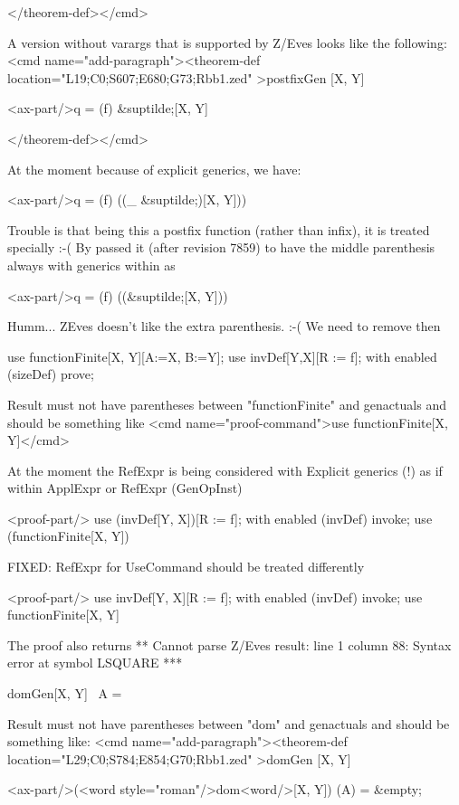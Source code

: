 </theorem-def></cmd>


 A version without varargs that is supported by Z/Eves looks like the following:
<cmd name="add-paragraph"><theorem-def location="L19;C0;S607;E680;G73;Rbb1.zed"   >postfixGen
[X, Y]

<ax-part/>q  =  (f) &suptilde;[X, Y]

</theorem-def></cmd>


 At the moment because of explicit generics, we have:

<ax-part/>q  =  (f) ((_ &suptilde;)[X, Y]))

Trouble is that being this a postfix function (rather than infix), it is treated specially :-(
By passed it (after revision 7859) to have the middle parenthesis always with generics within as

<ax-part/>q  =  (f) ((&suptilde;[X, Y]))

Humm... ZEves doesn't like the extra parenthesis. :-( We need to remove then

\begin{zproof}[postfixGen]
use functionFinite[X, Y][A:=X, B:=Y];
use invDef[Y,X][R := f];
with enabled (sizeDef) prove;
\end{zproof}

Result must not have parentheses between "functionFinite" and genactuals and should be something like
<cmd name="proof-command">use functionFinite[X, Y]</cmd>

At the moment the RefExpr is being considered with Explicit generics (!) as if within ApplExpr or RefExpr (GenOpInst)

<proof-part/>
use (invDef[Y, X])[R := f];
with enabled (invDef) invoke;
use (functionFinite[X, Y])

FIXED: RefExpr for UseCommand should be treated differently

<proof-part/> use invDef[Y, X][R := f];
with enabled (invDef) invoke;
use functionFinite[X, Y]

The proof also returns
**
Cannot parse Z/Eves result:
line 1 column 88: Syntax error at symbol LSQUARE
***


\begin{theorem}{domGen}[X, Y]
     \dom[X, Y]~A = \emptyset
\end{theorem}
 Result must not have parentheses between "dom" and genactuals and should be something like:
<cmd name="add-paragraph"><theorem-def location="L29;C0;S784;E854;G70;Rbb1.zed"   >domGen
[X, Y]

<ax-part/>(<word style="roman"/>dom<word/>[X, Y]) (A)  =  &empty;

